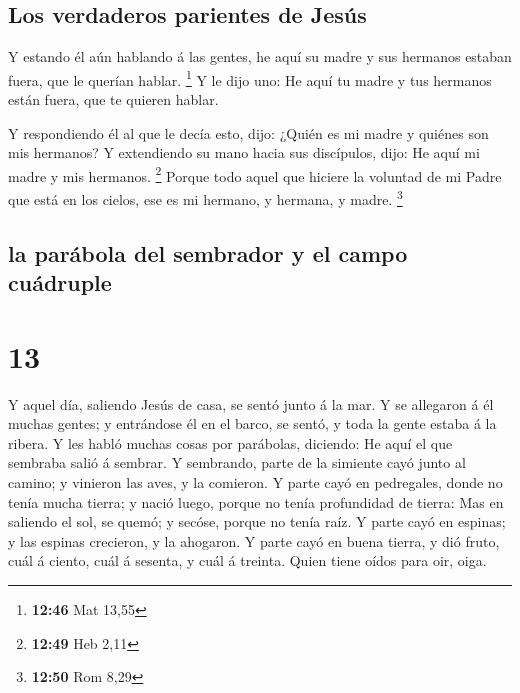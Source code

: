 \hypertarget{los-verdaderos-parientes-de-jesuxfas}{%
\subsection{Los verdaderos parientes de
Jesús}\label{los-verdaderos-parientes-de-jesuxfas}}

 Y estando él aún hablando á las gentes, he aquí su madre
y sus hermanos estaban fuera, que le querían hablar. \footnote{\textbf{12:46}
  Mat 13,55}  Y le dijo uno: He aquí tu madre y tus
hermanos están fuera, que te quieren hablar.

 Y respondiendo él al que le decía esto, dijo: ¿Quién es
mi madre y quiénes son mis hermanos?  Y extendiendo su
mano hacia sus discípulos, dijo: He aquí mi madre y mis hermanos.
\footnote{\textbf{12:49} Heb 2,11}  Porque todo aquel que
hiciere la voluntad de mi Padre que está en los cielos, ese es mi
hermano, y hermana, y madre. \footnote{\textbf{12:50} Rom 8,29}

\hypertarget{la-paruxe1bola-del-sembrador-y-el-campo-cuuxe1druple}{%
\subsection{la parábola del sembrador y el campo
cuádruple}\label{la-paruxe1bola-del-sembrador-y-el-campo-cuuxe1druple}}

\hypertarget{section-12}{%
\section{13}\label{section-12}}

 Y aquel día, saliendo Jesús de casa, se sentó junto á la
mar.  Y se allegaron á él muchas gentes; y entrándose él
en el barco, se sentó, y toda la gente estaba á la ribera.
 Y les habló muchas cosas por parábolas, diciendo: He aquí
el que sembraba salió á sembrar.  Y sembrando, parte de la
simiente cayó junto al camino; y vinieron las aves, y la comieron.
 Y parte cayó en pedregales, donde no tenía mucha tierra;
y nació luego, porque no tenía profundidad de tierra:  Mas
en saliendo el sol, se quemó; y secóse, porque no tenía raíz.
 Y parte cayó en espinas; y las espinas crecieron, y la
ahogaron.  Y parte cayó en buena tierra, y dió fruto, cuál
á ciento, cuál á sesenta, y cuál á treinta.  Quien tiene
oídos para oir, oiga.

